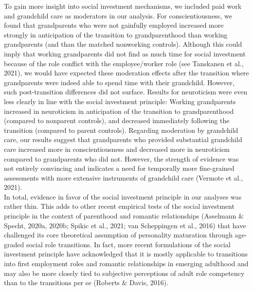 \documentclass[
  english,
  man, noextraspace]{apa7}
\begin{document}
To gain more insight into social investment mechanisms, we included paid work and grandchild care as moderators in our analysis. For conscientiousness, we found that grandparents who were not gainfully employed increased more strongly in anticipation of the transition to grandparenthood than working grandparents (and than the matched nonworking controls). Although this could imply that working grandparents did not find as much time for social investment because of the role conflict with the employee/worker role (see Tanskanen et al., 2021), we would have expected these moderation effects after the transition where grandparents were indeed able to spend time with their grandchild. However, such post-transition differences did not surface. Results for neuroticism were even less clearly in line with the social investment principle: Working grandparents increased in neuroticism in anticipation of the transition to grandparenthood (compared to nonparent controls), and decreased immediately following the transition (compared to parent controls). Regarding moderation by grandchild care, our results suggest that grandparents who provided substantial grandchild care increased more in conscientiousness and decreased more in neuroticism compared to grandparents who did not. However, the strength of evidence was not entirely convincing and indicates a need for temporally more fine-grained assessments with more extensive instruments of grandchild care (Vermote et al., 2021).\\
In total, evidence in favor of the social investment principle in our analyses was rather thin. This adds to other recent empirical tests of the social investment principle in the context of parenthood and romantic relationships (Asselmann \& Specht, 2020a, 2020b; Spikic et al., 2021; van Scheppingen et al., 2016) that have challenged its core theoretical assumption of personality maturation through age-graded social role transitions. In fact, more recent formulations of the social investment principle have acknowledged that it is mostly applicable to transitions into first employment roles and romantic relationships in emerging adulthood and may also be more closely tied to subjective perceptions of adult role competency than to the transitions per se (Roberts \& Davis, 2016).\\
\end{document}
